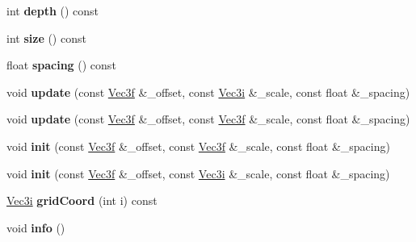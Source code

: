 \begin{DoxyCompactItemize}
\item 
\hypertarget{classhokusai_1_1GridUtility_a9fc64ec32a5d06efc410a51dcda611c0}{int {\bfseries depth} () const }\label{classhokusai_1_1GridUtility_a9fc64ec32a5d06efc410a51dcda611c0}

\item 
\hypertarget{classhokusai_1_1GridUtility_a4a64a5bbbfb07552bfffc53d75a0a9c6}{int {\bfseries size} () const }\label{classhokusai_1_1GridUtility_a4a64a5bbbfb07552bfffc53d75a0a9c6}

\item 
\hypertarget{classhokusai_1_1GridUtility_aaad5cd2c31482719d86547d0d85dd4ed}{float {\bfseries spacing} () const }\label{classhokusai_1_1GridUtility_aaad5cd2c31482719d86547d0d85dd4ed}

\item 
\hypertarget{classhokusai_1_1GridUtility_a785b8cf0615949669656c7d7f2be81c3}{void {\bfseries update} (const \hyperlink{classhokusai_1_1Vec3}{Vec3f} \&\+\_\+offset, const \hyperlink{classhokusai_1_1Vec3}{Vec3i} \&\+\_\+scale, const float \&\+\_\+spacing)}\label{classhokusai_1_1GridUtility_a785b8cf0615949669656c7d7f2be81c3}

\item 
\hypertarget{classhokusai_1_1GridUtility_a8f5f081ec0171248eef94db2956326e8}{void {\bfseries update} (const \hyperlink{classhokusai_1_1Vec3}{Vec3f} \&\+\_\+offset, const \hyperlink{classhokusai_1_1Vec3}{Vec3f} \&\+\_\+scale, const float \&\+\_\+spacing)}\label{classhokusai_1_1GridUtility_a8f5f081ec0171248eef94db2956326e8}

\item 
\hypertarget{classhokusai_1_1GridUtility_aed5362dc5e59ee2acd67f733cdafdbbd}{void {\bfseries init} (const \hyperlink{classhokusai_1_1Vec3}{Vec3f} \&\+\_\+offset, const \hyperlink{classhokusai_1_1Vec3}{Vec3f} \&\+\_\+scale, const float \&\+\_\+spacing)}\label{classhokusai_1_1GridUtility_aed5362dc5e59ee2acd67f733cdafdbbd}

\item 
\hypertarget{classhokusai_1_1GridUtility_a51f79ec19ef15e5a73ee10288686d28b}{void {\bfseries init} (const \hyperlink{classhokusai_1_1Vec3}{Vec3f} \&\+\_\+offset, const \hyperlink{classhokusai_1_1Vec3}{Vec3i} \&\+\_\+scale, const float \&\+\_\+spacing)}\label{classhokusai_1_1GridUtility_a51f79ec19ef15e5a73ee10288686d28b}

\item 
\hypertarget{classhokusai_1_1GridUtility_a0c6b3f9dd3cdbbc3a5055951995e34f5}{\hyperlink{classhokusai_1_1Vec3}{Vec3i} {\bfseries grid\+Coord} (int i) const }\label{classhokusai_1_1GridUtility_a0c6b3f9dd3cdbbc3a5055951995e34f5}

\item 
\hypertarget{classhokusai_1_1GridUtility_a006be07a4eed7b4be0baa165f1191d18}{void {\bfseries info} ()}\label{classhokusai_1_1GridUtility_a006be07a4eed7b4be0baa165f1191d18}

\end{DoxyCompactItemize}
